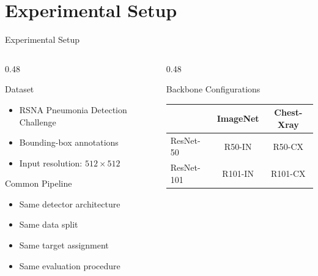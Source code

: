 \documentclass[aspectratio=169,11pt]{beamer}
\begin{document}

\section{Experimental Setup}


\begin{frame}{Experimental Setup}

\begin{columns}[t]

\begin{column}{0.48\textwidth}

\begin{block}{Dataset}
\small
\begin{itemize}
    \item RSNA Pneumonia Detection Challenge
    \item Bounding-box annotations
    \item Input resolution: $512\times512$
\end{itemize}
\end{block}

\vspace{0.2cm}

\begin{block}{Common Pipeline}
\small
\begin{itemize}
    \item Same detector architecture
    \item Same data split
    \item Same target assignment
    \item Same evaluation procedure
\end{itemize}
\end{block}

\end{column}

\begin{column}{0.48\textwidth}

\begin{block}{Backbone Configurations}
\centering
\begin{tabular}{lcc}
\toprule
 & \textbf{ImageNet} & \textbf{Chest-Xray} \\
\midrule
ResNet-50  & R50-IN  & R50-CX \\
ResNet-101 & R101-IN & R101-CX \\
\bottomrule
\end{tabular}
\end{block}


\end{column}
\end{columns}
\end{frame}
\end{document}
